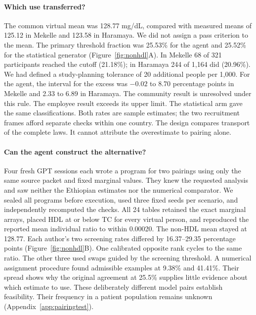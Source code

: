 \documentclass[sigconf,anonymous,review]{acmart}
\begin{document}
\paragraph{Which use transferred?}
The common virtual mean was 128.77 mg/dL, compared with measured means of 125.12 in Mekelle and 123.58 in Haramaya. We did not assign a pass criterion to the mean. The primary threshold fraction was 25.53\% for the agent and 25.52\% for the statistical generator (Figure~\ref{fig:nonhdl}A). In Mekelle 68 of 321 participants reached the cutoff (21.18\%); in Haramaya 244 of 1,164 did (20.96\%). We had defined a study-planning tolerance of 20 additional people per 1,000. For the agent, the interval for the excess was $-0.02$ to 8.70 percentage points in Mekelle and 2.33 to 6.89 in Haramaya. The community result is unresolved under this rule. The employee result exceeds its upper limit. The statistical arm gave the same classifications. Both rates are sample estimates; the two recruitment frames afford separate checks within one country. The design compares transport of the complete laws. It cannot attribute the overestimate to pairing alone.

\paragraph{Can the agent construct the alternative?}

Four fresh GPT sessions each wrote a program for two pairings using only the same source packet and fixed marginal values. They knew the requested analysis and saw neither the Ethiopian estimates nor the numerical comparator. We sealed all programs before execution, used three fixed seeds per scenario, and independently recomputed the checks. All 24 tables retained the exact marginal arrays, placed HDL at or below TC for every virtual person, and reproduced the reported mean individual ratio to within 0.00020. The non-HDL mean stayed at 128.77. Each author's two screening rates differed by 16.37--29.35 percentage points (Figure~\ref{fig:nonhdl}B). One calibrated opposite rank cycles to the same ratio. The other three used swaps guided by the screening threshold. A numerical assignment procedure found admissible examples at 9.38\% and 41.41\%. Their spread shows why the original agreement at 25.5\% supplies little evidence about which estimate to use. These deliberately different model pairs establish feasibility. Their frequency in a patient population remains unknown (Appendix~\ref{app:pairingtest}).
\end{document}
